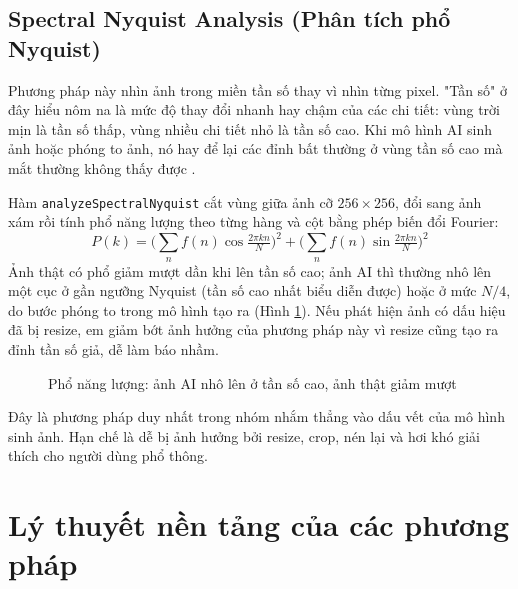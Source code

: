 \documentclass[14pt,a4paper,oneside]{report}
\begin{document}
\subsection{Spectral Nyquist Analysis (Phân tích phổ Nyquist)}
Phương pháp này nhìn ảnh trong miền tần số thay vì nhìn từng pixel. "Tần số" ở đây hiểu nôm na là mức độ thay đổi nhanh hay chậm của các chi tiết: vùng trời mịn là tần số thấp, vùng nhiều chi tiết nhỏ là tần số cao. Khi mô hình AI sinh ảnh hoặc phóng to ảnh, nó hay để lại các đỉnh bất thường ở vùng tần số cao mà mắt thường không thấy được \cite{durall2020,wang2020}.

Hàm \texttt{analyzeSpectralNyquist} cắt vùng giữa ảnh cỡ $256\times256$, đổi sang ảnh xám rồi tính phổ năng lượng theo từng hàng và cột bằng phép biến đổi Fourier:
\[
P(k)=\Big(\sum_{n} f(n)\cos\tfrac{2\pi kn}{N}\Big)^2+\Big(\sum_{n} f(n)\sin\tfrac{2\pi kn}{N}\Big)^2
\]
Ảnh thật có phổ giảm mượt dần khi lên tần số cao; ảnh AI thì thường nhô lên một cục ở gần ngưỡng Nyquist (tần số cao nhất biểu diễn được) hoặc ở mức $N/4$, do bước phóng to trong mô hình tạo ra (Hình \ref{fig:spectral-curve}). Nếu phát hiện ảnh có dấu hiệu đã bị resize, em giảm bớt ảnh hưởng của phương pháp này vì resize cũng tạo ra đỉnh tần số giả, dễ làm báo nhầm.

\begin{figure}[H]
\centering
{}
\caption{Phổ năng lượng: ảnh AI nhô lên ở tần số cao, ảnh thật giảm mượt}
\label{fig:spectral-curve}
\end{figure}

Đây là phương pháp duy nhất trong nhóm nhắm thẳng vào dấu vết của mô hình sinh ảnh. Hạn chế là dễ bị ảnh hưởng bởi resize, crop, nén lại và hơi khó giải thích cho người dùng phổ thông.

\section{Lý thuyết nền tảng của các phương pháp}
\end{document}
